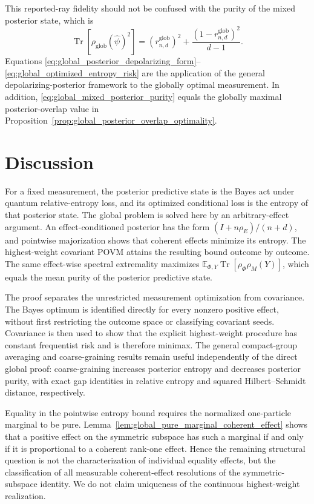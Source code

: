 \documentclass[journal]{IEEEtran}
\begin{document}
This reported-ray fidelity should not be confused with the purity of the mixed
posterior state, which is
\begin{equation}
    \operatorname{Tr}[\rho_{\mathrm{glob}}(\widehat\psi)^2]
    =
    \left(r_{n,d}^{\mathrm{glob}}\right)^2
    +
    \frac{\left(1-r_{n,d}^{\mathrm{glob}}\right)^2}{d-1}.
    \label{eq:global_mixed_posterior_purity}
\end{equation}
Equations \eqref{eq:global_posterior_depolarizing_form}--
\eqref{eq:global_optimized_entropy_risk} are the application of the general
depolarizing-posterior framework to the globally optimal measurement.  In
addition, \eqref{eq:global_mixed_posterior_purity} equals the globally maximal
posterior-overlap value in
Proposition~\ref{prop:global_posterior_overlap_optimality}.



\section{Discussion}
\label{sec:discussion}
For a fixed measurement, the posterior predictive state is the Bayes act under
quantum relative-entropy loss, and its optimized conditional loss is the
entropy of that posterior state.  The global problem is solved here by an
arbitrary-effect argument.  An effect-conditioned posterior has the form
\((I+n\rho_E)/(n+d)\), and pointwise majorization shows that coherent effects
minimize its entropy.  The highest-weight covariant POVM attains the resulting
bound outcome by outcome.  The same effect-wise spectral extremality maximizes
\(\mathbb E_{\Phi,Y}\operatorname{Tr}[\rho_\Phi\rho_M(Y)]\), which equals the mean
purity of the posterior predictive state.

The proof separates the unrestricted measurement optimization from covariance.
The Bayes optimum is identified directly for every nonzero positive effect,
without first restricting the outcome space or classifying covariant seeds.
Covariance is then used to show that the explicit highest-weight procedure has
constant frequentist risk and is therefore minimax.  The general compact-group
averaging and coarse-graining results remain useful independently of the direct
global proof: coarse-graining increases posterior entropy and decreases
posterior purity, with exact gap identities in relative entropy and squared
Hilbert--Schmidt distance, respectively.

Equality in the pointwise entropy bound requires the normalized one-particle
marginal to be pure.  Lemma~\ref{lem:global_pure_marginal_coherent_effect}
shows that a positive effect on the symmetric subspace has such a marginal if
and only if it is proportional to a coherent rank-one effect.  Hence the
remaining structural question is not the characterization of individual
equality effects, but the classification of all measurable coherent-effect
resolutions of the symmetric-subspace identity.  We do not claim uniqueness of
the continuous highest-weight realization.
\end{document}
